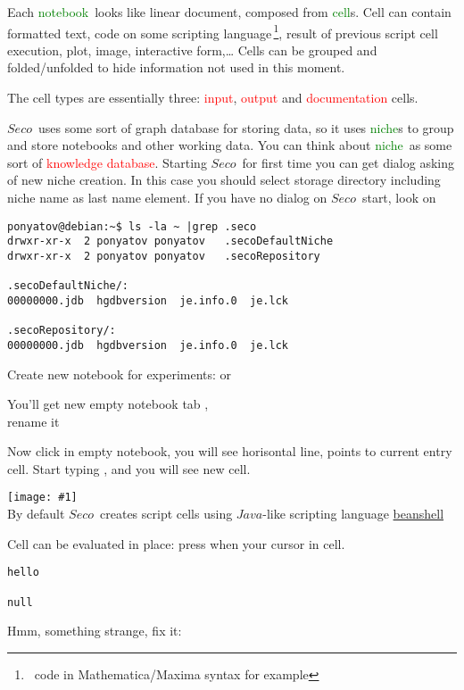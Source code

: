 \documentclass[oneside,10pt]{book}
\newcommand{\fig}[2]{\noindent\texttt{[image: \#1]}}
\renewcommand{\emph}[1]{\textcolor{red}{#1}}
\newcommand{\note}[1]{\,\footnote{\ #1}}
\newcommand{\term}[1]{\textcolor{green}{#1}}
\newcommand{\rms}{$\rhd$}
\newcommand{\seco}{$Seco$}
\newcommand{\java}{$Java$}
\begin{document}
  Each \term{notebook}\ looks like linear document, composed from \term{cell}s.
  Cell can contain formatted text, code on some scripting language\note{code in
  Mathematica/Maxima syntax for example}, result of previous script cell
  execution, plot, image, interactive form,\ldots
  Cells can be grouped and folded/unfolded to hide information not used in this
  moment.
  
  The cell types are essentially three: \emph{input}, \emph{output} and
  \emph{documentation} cells.
  
  \seco\ uses some sort of graph database for storing data, so it uses
  \term{niche}s to group and store notebooks and other working data.
  You can think about \term{niche}\ as some sort of \emph{knowledge database}.
  Starting \seco\ for first time you can get dialog asking of new niche
  creation. In this case you should select storage directory including niche
  name as last name element. If you have no dialog on \seco\ start, look on
\begin{verbatim}
ponyatov@debian:~$ ls -la ~ |grep .seco
drwxr-xr-x  2 ponyatov ponyatov   .secoDefaultNiche
drwxr-xr-x  2 ponyatov ponyatov   .secoRepository

.secoDefaultNiche/:
00000000.jdb  hgdbversion  je.info.0  je.lck

.secoRepository/:
00000000.jdb  hgdbversion  je.info.0  je.lck
\end{verbatim}

\noindent  
Create new notebook for experiments:  or 

\noindent  
You'll get new empty notebook tab ,\\
rename it \menu{CG>\rms>Rename>Tutorial}
\bigskip

Now click in empty notebook, you will see horisontal line, points to current
entry cell. Start typing , and you will see new cell.

\bigskip
\fig{fig/hello.png}{width=0.8\textwidth}\\
By default \seco\ creates script cells using \java-like scripting language
\href{http://www.beanshell.org/manual/quickstart.html}{beanshell}

\clearpage
Cell can be evaluated in place: press  when your cursor 
in cell.
\begin{verbatim}
hello

null
\end{verbatim}

Hmm, something strange, fix it:
\end{document}
